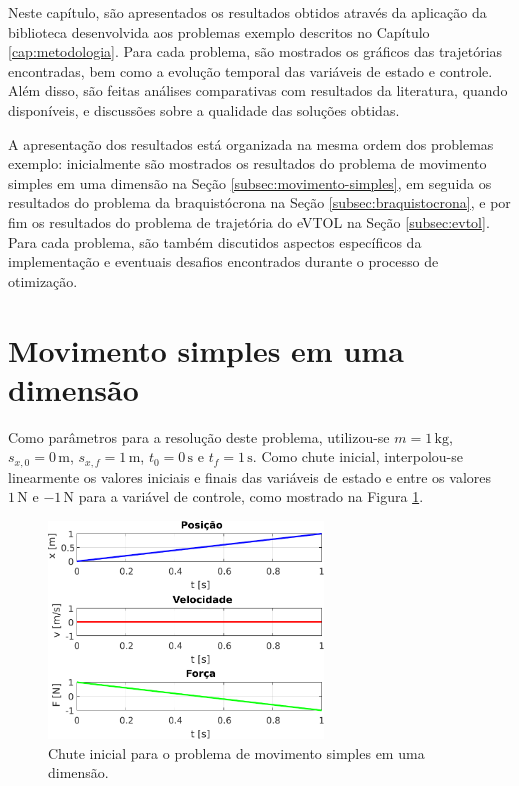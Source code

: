 Neste capítulo, são apresentados os resultados obtidos através da aplicação da biblioteca desenvolvida aos problemas exemplo descritos no Capítulo \ref{cap:metodologia}. Para cada problema, são mostrados os gráficos das trajetórias encontradas, bem como a evolução temporal das variáveis de estado e controle. Além disso, são feitas análises comparativas com resultados da literatura, quando disponíveis, e discussões sobre a qualidade das soluções obtidas.

A apresentação dos resultados está organizada na mesma ordem dos problemas exemplo: inicialmente são mostrados os resultados do problema de movimento simples em uma dimensão na Seção \ref{subsec:movimento-simples}, em seguida os resultados do problema da braquistócrona na Seção \ref{subsec:braquistocrona}, e por fim os resultados do problema de trajetória do eVTOL na Seção \ref{subsec:evtol}. Para cada problema, são também discutidos aspectos específicos da implementação e eventuais desafios encontrados durante o processo de otimização.

\section{Movimento simples em uma dimensão}
\label{sec:resultados-movimento-simples}

Como parâmetros para a resolução deste problema, utilizou-se $m=1 \, \si{\kilo\gram}$, $s_{x,0}=0 \, \si{\meter}$, $s_{x,f}=1 \, \si{\meter}$, $t_0=0 \, \si{\second}$ e $t_f=1 \, \si{\second}$. Como chute inicial, interpolou-se linearmente os valores iniciais e finais das variáveis de estado e entre os valores $1 \, \si{\newton}$ e $-1 \, \si{\newton}$ para a variável de controle, como mostrado na Figura \ref{fig:resultados-movimento-simples-chute}.

\begin{figure}
    \centering
    \includegraphics[width=0.65\textwidth]{Cap4/figuras/movimento-simples-chute.pdf}
    \caption{Chute inicial para o problema de movimento simples em uma dimensão.}
    \label{fig:resultados-movimento-simples-chute}
\end{figure}

